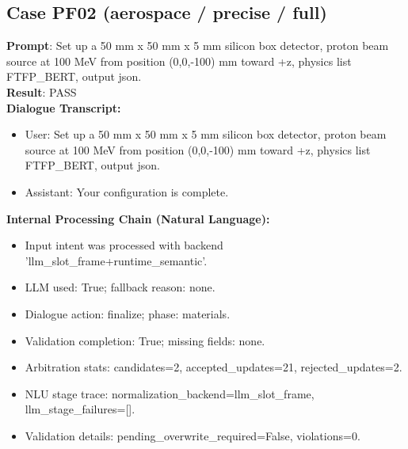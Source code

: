 \documentclass[11pt]{ctexart}
\begin{document}
\subsection{Case PF02 (aerospace / precise / full)}
\textbf{Prompt}: Set up a 50 mm x 50 mm x 5 mm silicon box detector, proton beam source at 100 MeV from position (0,0,-100) mm toward +z, physics list FTFP\_BERT, output json.\\
\textbf{Result}: PASS\\
\textbf{Dialogue Transcript:}
\begin{itemize}
\item User: Set up a 50 mm x 50 mm x 5 mm silicon box detector, proton beam source at 100 MeV from position (0,0,-100) mm toward +z, physics list FTFP\_BERT, output json.
\item Assistant: Your configuration is complete.
\end{itemize}
\textbf{Internal Processing Chain (Natural Language):}
\begin{itemize}
\item Input intent was processed with backend 'llm\_slot\_frame+runtime\_semantic'.
\item LLM used: True; fallback reason: none.
\item Dialogue action: finalize; phase: materials.
\item Validation completion: True; missing fields: none.
\item Arbitration stats: candidates=2, accepted\_updates=21, rejected\_updates=2.
\item NLU stage trace: normalization\_backend=llm\_slot\_frame, llm\_stage\_failures=[].
\item Validation details: pending\_overwrite\_required=False, violations=0.
\end{itemize}
\end{document}
